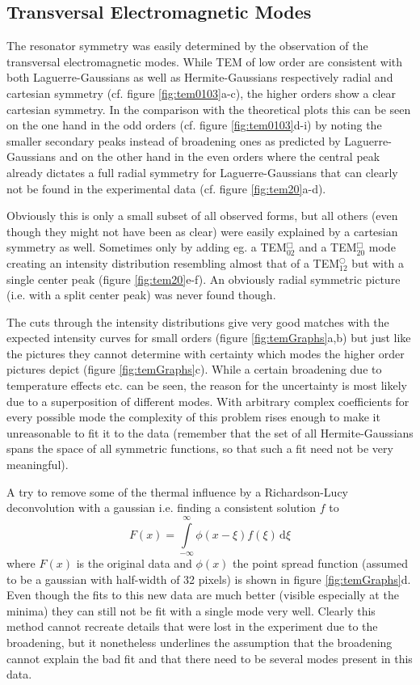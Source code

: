 \documentclass[a4paper]{scrartcl}
\numberwithin{equation}{section}
\numberwithin{figure}{section}
\numberwithin{table}{section}
\newcommand{\eq}[2]{\begin{equation}#1\label{#2}\end{equation}}
\begin{document}
\subsection{Transversal Electromagnetic Modes}
The resonator symmetry was easily determined by the observation of the transversal electromagnetic modes. While TEM of low order are consistent with both Laguerre-Gaussians as well as Hermite-Gaussians respectively radial and cartesian symmetry (cf. figure \ref{fig:tem0103}a-c), the higher orders show a clear cartesian symmetry. In the comparison with the theoretical plots this can be seen on the one hand in the odd orders (cf. figure \ref{fig:tem0103}d-i) by noting the smaller secondary peaks instead of broadening ones as predicted by Laguerre-Gaussians and on the other hand in the even orders where the central peak already dictates a full radial symmetry for Laguerre-Gaussians that can clearly not be found in the experimental data (cf. figure \ref{fig:tem20}a-d).

Obviously this is only a small subset of all observed forms, but all others (even though they might not have been as clear) were easily explained by a cartesian symmetry as well. Sometimes only by adding eg. a TEM$^\Box_{02}$ and a TEM$^\Box_{20}$ mode creating an intensity distribution resembling almost that of a TEM$^\bigcirc_{12}$ but with a single center peak (figure \ref{fig:tem20}e-f). An obviously radial symmetric picture (i.e. with a split center peak) was never found though.

The cuts through the intensity distributions give very good matches with the expected intensity curves for small orders (figure \ref{fig:temGraphs}a,b) but just like the pictures they cannot determine with certainty which modes the higher order pictures depict (figure \ref{fig:temGraphs}c). While a certain broadening due to temperature effects etc. can be seen, the reason for the uncertainty is most likely due to a superposition of different modes. With arbitrary complex coefficients for every possible mode the complexity of this problem rises enough to make it unreasonable to fit it to the data (remember that the set of all Hermite-Gaussians spans the space of all symmetric functions, so that such a fit need not be very meaningful).

A try to remove some of the thermal influence by a Richardson-Lucy deconvolution with a gaussian i.e. finding a consistent solution $f$ to 
\eq{F(x)=\int\limits_{-\infty}^{\infty}\!\!\phi(x-\xi) f(\xi) \, \text{d}\xi}{}
where $F(x)$ is the original data and $\phi(x)$ the point spread function (assumed to be a gaussian with half-width of 32 pixels) is shown in figure \ref{fig:temGraphs}d. Even though the fits to this new data are much better (visible especially at the minima) they can still not be fit with a single mode very well. Clearly this method cannot recreate details that were lost in the experiment due to the broadening, but it nonetheless underlines the assumption that the broadening cannot explain the bad fit and that there need to be several modes present in this data.
\end{document}
